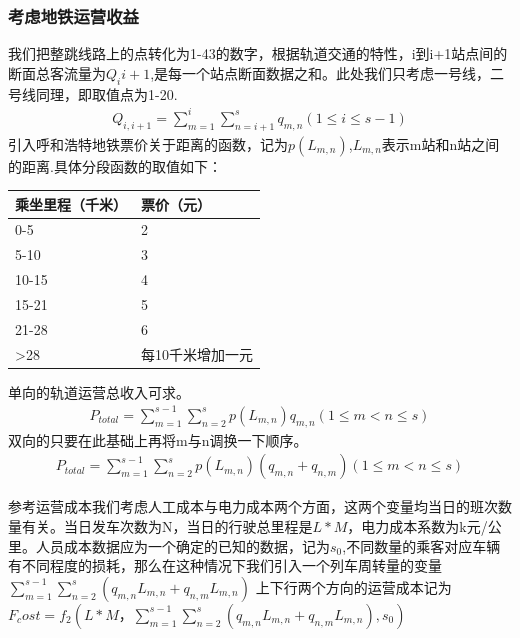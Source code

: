 \documentclass[12pt,a4paper]{mcmthesis}
\begin{document}
    \subsubsection{考虑地铁运营收益}
    我们把整跳线路上的点转化为1-43的数字，根据轨道交通的特性，i到i+1站点间的断面总客流量为$Q_{i}{i+1}$,是每一个站点断面数据之和。此处我们只考虑一号线，二号线同理，即取值点为1-20.
    \begin{equation}
        \begin{aligned}
            Q_{i,i+1}=\sum_{m=1}^{i}\sum_{n=i+1}^{s}q_{m,n}(1\leqslant i\leqslant s-1)
        \end{aligned}
    \end{equation}
    引入呼和浩特地铁票价关于距离的函数，记为$p(L_{m,n})$,$L_{m,n}$表示m站和n站之间的距离.具体分段函数的取值如下：
    \begin{table}
        \centering
        \begin{tabular}{|l|l|}
            \hline
            乘坐里程（千米） & 票价（元）     \\ \hline
            0-5      & 2         \\ \hline
            5-10     & 3         \\ \hline
            10-15    & 4         \\ \hline
            15-21    & 5         \\ \hline
            21-28    & 6         \\ \hline
            >28      & 每10千米增加一元 \\ \hline
        \end{tabular}
    \end{table}
    单向的轨道运营总收入可求。
    \begin{equation}
        \begin{aligned}
            P_{total}=\sum_{m=1}^{s-1}\sum_{n=2}^{s}p(L_{m,n})q_{m,n} (1\leqslant m< n\leq s)
        \end{aligned}
    \end{equation}
    双向的只要在此基础上再将m与n调换一下顺序。
    \begin{equation}
        \begin{aligned}
            P_{total}=\sum_{m=1}^{s-1}\sum_{n=2}^{s}p(L_{m,n})(q_{m,n}+q_{n,m}) (1\leqslant m< n\leq s)
        \end{aligned}
    \end{equation}

    参考\cite{运营计划}运营成本我们考虑人工成本与电力成本两个方面，这两个变量均当日的班次数量有关。当日发车次数为N，当日的行驶总里程是$L*M$，电力成本系数为k元/公里。人员成本数据应为一个确定的已知的数据，记为$s_0$,不同数量的乘客对应车辆有不同程度的损耗，那么在这种情况下我们引入一个列车周转量的变量$\sum_{m=1}^{s-1}\sum_{n=2}^{s}(q_{m,n}L_{m,n}+q_{n,m}L_{m,n})$
    上下行两个方向的运营成本记为$F_cost=f_2(L*M，\sum_{m=1}^{s-1}\sum_{n=2}^{s}(q_{m,n}L_{m,n}+q_{n,m}L_{m,n}),s_0)$
\end{document}
